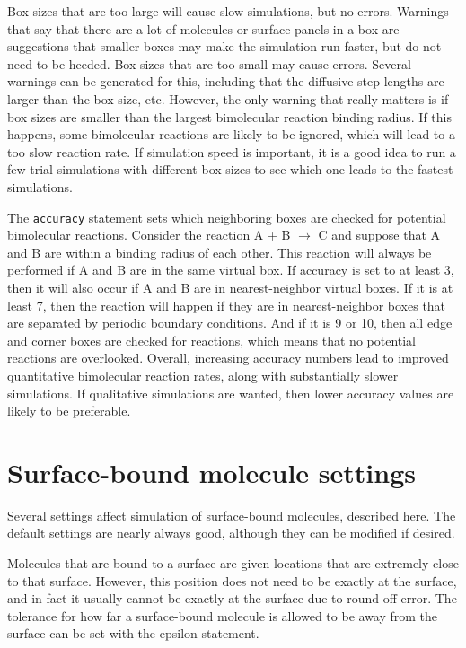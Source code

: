 \documentclass {scrbook}
\newcommand {\ttt} {\texttt}
\begin{document}
Box sizes that are too large will cause slow simulations, but no errors. Warnings that say that there are a lot of molecules or surface panels in a box are suggestions that smaller boxes may make the simulation run faster, but do not need to be heeded. Box sizes that are too small may cause errors. Several warnings can be generated for this, including that the diffusive step lengths are larger than the box size, etc. However, the only warning that really matters is if box sizes are smaller than the largest bimolecular reaction binding radius. If this happens, some bimolecular reactions are likely to be ignored, which will lead to a too slow reaction rate. If simulation speed is important, it is a good idea to run a few trial simulations with different box sizes to see which one leads to the fastest simulations.

The \ttt{accuracy} statement sets which neighboring boxes are checked for potential bimolecular reactions. Consider the reaction A + B $\rightarrow$ C and suppose that A and B are within a binding radius of each other. This reaction will always be performed if A and B are in the same virtual box. If accuracy is set to at least 3, then it will also occur if A and B are in nearest-neighbor virtual boxes. If it is at least 7, then the reaction will happen if they are in nearest-neighbor boxes that are separated by periodic boundary conditions. And if it is 9 or 10, then all edge and corner boxes are checked for reactions, which means that no potential reactions are overlooked. Overall, increasing accuracy numbers lead to improved quantitative bimolecular reaction rates, along with substantially slower simulations. If qualitative simulations are wanted, then lower accuracy values are likely to be preferable.

\section{Surface-bound molecule settings}

Several settings affect simulation of surface-bound molecules, described here. The default settings are nearly always good, although they can be modified if desired.

Molecules that are bound to a surface are given locations that are extremely close to that surface. However, this position does not need to be exactly at the surface, and in fact it usually cannot be exactly at the surface due to round-off error. The tolerance for how far a surface-bound molecule is allowed to be away from the surface can be set with the epsilon statement.
\end{document}
